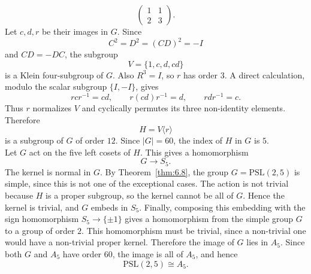 \documentclass[../Odyssey_Project.tex]{subfiles}
\begin{document}
\begin{solution}
\[\begin{pmatrix}
        1 & 1\\
        2 & 3
    \end{pmatrix}.
\]
Let $c,d,r$ be their images in $G$. Since
\[
    C^2=D^2=(CD)^2=-I
\]
and $CD=-DC$, the subgroup
\[
    V=\{1,c,d,cd\}
\]
is a Klein four-subgroup of $G$. Also $R^3=I$, so $r$ has order $3$. A direct calculation, modulo the scalar subgroup $\{I,-I\}$, gives
\[
    rcr^{-1}=cd,\qquad
    r(cd)r^{-1}=d,\qquad
    rdr^{-1}=c.
\]
Thus $r$ normalizes $V$ and cyclically permutes its three non-identity elements. Therefore
\[
    H=V\langle r\rangle
\]
is a subgroup of $G$ of order $12$. Since $\lvert G\rvert=60$, the index of $H$ in $G$ is $5$.\\
Let $G$ act on the five left cosets of $H$. This gives a homomorphism
\[
    G\to S_5.
\]
The kernel is normal in $G$. By Theorem~\ref{thm:6.8}, the group $G=\mathrm{PSL}(2,5)$ is simple, since this is not one of the exceptional cases. The action is not trivial because $H$ is a proper subgroup, so the kernel cannot be all of $G$. Hence the kernel is trivial, and $G$ embeds in $S_5$. Finally, composing this embedding with the sign homomorphism $S_5\to\{\pm1\}$ gives a homomorphism from the simple group $G$ to a group of order $2$. This homomorphism must be trivial, since a non-trivial one would have a non-trivial proper kernel. Therefore the image of $G$ lies in $A_5$. Since both $G$ and $A_5$ have order $60$, the image is all of $A_5$, and hence
\[
    \mathrm{PSL}(2,5)\cong A_5.
\]
\end{solution}
\end{document}
